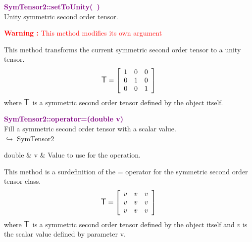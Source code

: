 \textcolor{purple}{\textbf{SymTensor2::setToUnity(~)}}\label{SymTensor2::setToUnity()}\\
Unity symmetric second order tensor.

\hspace*{10mm}\textcolor{red}{\textbf{Warning :} This method modifies its own argument}

This method transforms the current symmetric second order tensor to a unity tensor.
\begin{equation*}
\mbox{\large\ensuremath{\mathsf{T}}}=\left[\begin{array}{ccc}
1&0&0\\
0&1&0\\
0&0&1
\end{array}\right]
\end{equation*}
where $\mbox{\large\ensuremath{\mathsf{T}}}$ is a symmetric second order tensor defined by the object itself.

\textcolor{purple}{\textbf{SymTensor2::operator=(double v)}}\label{SymTensor2::operator=(double v)}\\
Fill a symmetric second order tensor with a scalar value.\\ \hspace*{10mm}$\hookrightarrow$ SymTensor2

\begin{tcolorbox}[width=\textwidth,myArgs,tabularx={ll|R}]
double & v & Value to use for the operation.
\end{tcolorbox}

This method is a surdefinition of the = operator for the symmetric second order tensor class.
\begin{equation*}
\mbox{\large\ensuremath{\mathsf{T}}}=\left[\begin{array}{ccc}
v & v & v\\
v & v & v\\
v & v & v
\end{array}\right]
\end{equation*}
where $\mbox{\large\ensuremath{\mathsf{T}}}$ is a symmetric second order tensor defined by the object itself and $v$ is the scalar value defined by parameter v.

